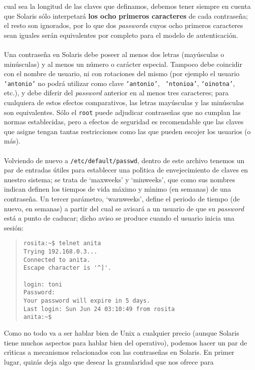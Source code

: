 cual sea la longitud de las claves que definamos, debemos tener siempre en
cuenta que Solaris s\'olo interpetar\'a {\bf los ocho primeros caracteres} de 
cada contrase\~na; el resto son ignorados, por lo que dos {\it passwords} cuyos
ocho primeros caracteres sean iguales ser\'an equivalentes por completo para el 
modelo de autenticaci\'on.\\
\\Una contrase\~na en Solaris debe poseer al menos dos letras (may\'usculas o
min\'usculas) y al menos un n\'umero o car\'acter especial. Tampoco debe 
coincidir con el nombre de usuario, ni con rotaciones del mismo (por ejemplo el 
usuario {\tt `antonio'} no podr\'a utilizar como clave {\tt `antonio'}, {\tt 
`ntonioa'}, {\tt `oinotna'}, etc.), y debe diferir del {\it password} 
anterior en al menos tres caracteres; para cualquiera de estos efectos 
comparativos, las letras may\'usculas y las min\'usculas son equivalentes. 
S\'olo el {\tt root} puede adjudicar contrase\~nas que no cumplan las normas
establecidas, pero a efectos de seguridad es recomendable que las claves que 
asigne tengan tantas restricciones como las que pueden escojer los usuarios (o
m\'as).\\
\\Volviendo de nuevo a {\tt /etc/default/passwd}, dentro de este archivo 
tenemos un par de entradas \'utiles para establecer una pol\'{\i}tica de 
envejecimiento de claves en nuestro sistema; se trata de {\sc `maxweeks'} y {\sc
`minweeks'}, que como sus nombres indican definen los tiempos de vida m\'aximo y
m\'{\i}nimo (en semanas) de una contrase\~na. Un tercer par\'ametro, {\sc 
`warnweeks'}, define el periodo de tiempo (de nuevo, en semanas) a partir del 
cual se avisar\'a a un usuario de que su {\it password} est\'a a punto de 
caducar; dicho aviso se produce cuando el usuario inicia una sesi\'on:
\begin{quote}
\begin{verbatim}
rosita:~$ telnet anita
Trying 192.168.0.3...
Connected to anita.
Escape character is '^]'.

login: toni
Password: 
Your password will expire in 5 days.
Last login: Sun Jun 24 03:10:49 from rosita
anita:~$ 
\end{verbatim}
\end{quote}
Como no todo va a ser hablar bien de Unix a cualquier precio (aunque Solaris 
tiene muchos aspectos para hablar bien del operativo), podemos hacer un par de
cr\'{\i}ticas a mecanismos relacionados con las contrase\~nas en Solaris. En
primer lugar, quiz\'as deja algo que desear la granularidad que nos ofrece para

